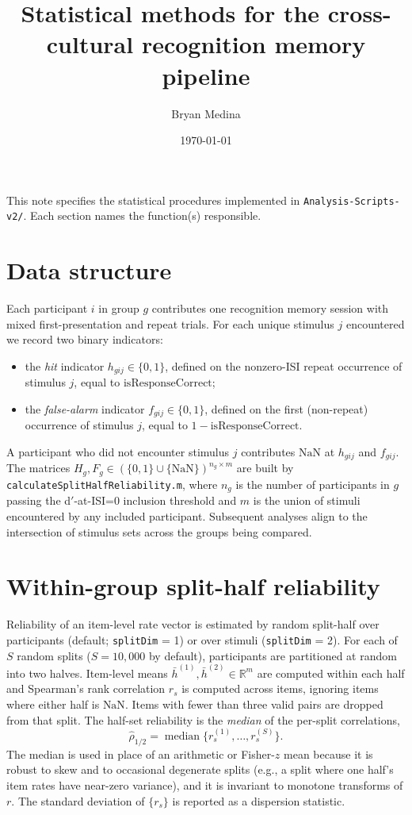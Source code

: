 \documentclass[11pt]{article}
\title{Statistical methods for the cross-cultural recognition memory pipeline}
\author{Bryan Medina}
\date{\today}
\newcommand{\NaN}{\text{NaN}}
\begin{document}
\maketitle

\noindent
This note specifies the statistical procedures implemented in \texttt{Analysis-Scripts-v2/}. Each section names the function(s) responsible.

\section{Data structure}
Each participant $i$ in group $g$ contributes one recognition memory session with mixed first-presentation and repeat trials. For each unique stimulus $j$ encountered we record two binary indicators:
\begin{itemize}
\item the \emph{hit} indicator $h_{gij}\in\{0,1\}$, defined on the nonzero-ISI repeat occurrence of stimulus $j$, equal to $\mathrm{isResponseCorrect}$;
\item the \emph{false-alarm} indicator $f_{gij}\in\{0,1\}$, defined on the first (non-repeat) occurrence of stimulus $j$, equal to $1-\mathrm{isResponseCorrect}$.
\end{itemize}
A participant who did not encounter stimulus $j$ contributes $\NaN$ at $h_{gij}$ and $f_{gij}$. The matrices $H_g, F_g\in(\{0,1\}\cup\{\NaN\})^{n_g\times m}$ are built by \texttt{calculateSplitHalfReliability.m}, where $n_g$ is the number of participants in $g$ passing the d$'$-at-ISI=0 inclusion threshold and $m$ is the union of stimuli encountered by any included participant. Subsequent analyses align to the intersection of stimulus sets across the groups being compared.

\section{Within-group split-half reliability}
Reliability of an item-level rate vector is estimated by random split-half over participants (default; \texttt{splitDim} = 1) or over stimuli (\texttt{splitDim} = 2). For each of $S$ random splits ($S=10{,}000$ by default), participants are partitioned at random into two halves. Item-level means $\bar h^{(1)},\bar h^{(2)}\in\mathbb{R}^m$ are computed within each half and Spearman's rank correlation $r_s$ is computed across items, ignoring items where either half is $\NaN$. Items with fewer than three valid pairs are dropped from that split. The half-set reliability is the \emph{median} of the per-split correlations,
\begin{equation}
\hat\rho_{1/2}=\operatorname{median}\{r_s^{(1)},\dots,r_s^{(S)}\}.
\end{equation}
The median is used in place of an arithmetic or Fisher-$z$ mean because it is robust to skew and to occasional degenerate splits (e.g., a split where one half's item rates have near-zero variance), and it is invariant to monotone transforms of $r$. The standard deviation of $\{r_s\}$ is reported as a dispersion statistic.
\end{document}
